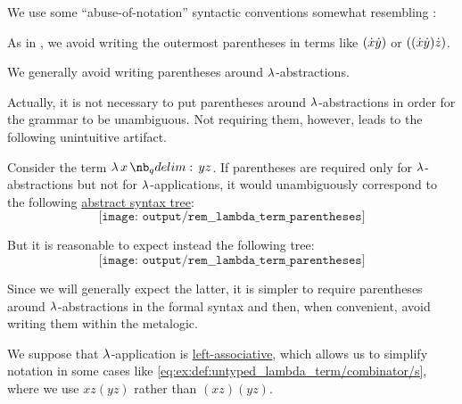 \begin{remark}\label{rem:lambda_term_parentheses}
  We use some \enquote{abuse-of-notation} syntactic conventions somewhat resembling :
  \begin{thmenum}
     As in , we avoid writing the outermost parentheses in terms like \( ({\dot{x}} {\dot{y}}) \) or \( (({\dot{x}} {\dot{y}}) {\dot{z}}) \).

     We generally avoid writing parentheses around \( \mathrm{\lambda} \)-abstractions.

    Actually, it is not necessary to put parentheses around \( \mathrm{\lambda} \)-abstractions in order for the grammar to be unambiguous. Not requiring them, however, leads to the following unintuitive artifact.

    Consider the term \( \qabs x y z \). If parentheses are required only for \( \mathrm{\lambda} \)-abstractions but not for \( \mathrm{\lambda} \)-applications, it would unambiguously correspond to the following \hyperref[rem:lambda_term_ast]{abstract syntax tree}:
    \begin{equation*}
      \texttt{[image: output/rem\_\_lambda\_term\_parentheses]}
    \end{equation*}

    But it is reasonable to expect instead the following tree:
    \begin{equation*}
      \texttt{[image: output/rem\_\_lambda\_term\_parentheses]}
    \end{equation*}

    Since we will generally expect the latter, it is simpler to require parentheses around \( \mathrm{\lambda} \)-abstractions in the formal syntax and then, when convenient, avoid writing them within the metalogic.

     We suppose that \( \mathrm{\lambda} \)-application is \hyperref[rem:binary_operation_syntax_trees/associativity]{left-associative}, which allows us to simplify notation in some cases like \eqref{eq:ex:def:untyped_lambda_term/combinator/s}, where we use \( xz(yz) \) rather than \( (xz)(yz) \).
  \end{thmenum}
\end{remark}

